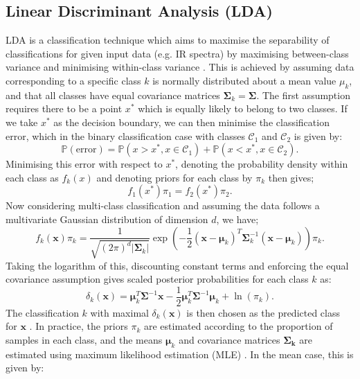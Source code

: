 \subsection{Linear Discriminant Analysis (LDA)}
\label{sec:methods:lda}
LDA \cite{fisher_use_1936} is a classification technique which aims to maximise the separability of classifications for given input data (e.g. IR spectra) by maximising between-class variance and minimising within-class variance \cite{tharwat_linear_2017}. This is achieved by assuming data corresponding to a specific class $k$ is normally distributed about a mean value $\mu_k$, and that all classes have equal covariance matrices $\boldsymbol{\Sigma}_k=\boldsymbol{\Sigma}$. The first assumption requires there to be a point $x^*$ which is equally likely to belong to two classes. If we take $x^*$ as the decision boundary, we can then minimise the classification error, which in the binary classification case with classes $\mathcal C_1$ and $\mathcal C_2$ is given by:
\begin{equation}
   \mathbb{P}(\text{error})= \mathbb{P}(x>x^*, x\in \mathcal C_1) + \mathbb{P}(x<x^*, x\in \mathcal C_2).
\end{equation}
Minimising this error with respect to $x^*$, denoting the probability density within each class as $f_k(x)$ and denoting priors for each class by $\pi_k$ then gives;
\begin{equation}
    f_1(x^*)\pi_1 = f_2(x^*)\pi_2.
\end{equation}
Now considering multi-class classification and assuming the data follows a multivariate Gaussian distribution of dimension $d$, we have;
\begin{equation}
    f_k(\boldsymbol{x})\pi_k=\frac{1}{\sqrt{(2\pi)^{d}|\mathbf{\Sigma}_k|}}\exp\left(-\frac{1}{2}(\boldsymbol{x}-\boldsymbol{\mu}_k)^T\boldsymbol{\Sigma}_k^{-1}(\boldsymbol{x}-\boldsymbol{\mu}_k)\right)\pi_k.
\end{equation}
Taking the logarithm of this, discounting constant terms and enforcing the equal covariance assumption gives scaled posterior probabilities for each class $k$ as:
\begin{equation}
    \delta_k(\boldsymbol{x}) = \boldsymbol{\mu}_k^T\boldsymbol{\Sigma}^{-1}\boldsymbol{x} - \frac{1}{2}\boldsymbol{\mu}_k^T\boldsymbol{\Sigma}^{-1}\boldsymbol{\mu}_k + \ln(\pi_k).
\end{equation}
The classification $k$ with maximal $\delta_k(\boldsymbol{x})$ is then chosen as the predicted class for $\boldsymbol{x}$ \cite{ghojogh_linear_2019}. In practice, the priors $\pi_k$ are estimated according to the proportion of samples in each class, and the means $\boldsymbol \mu_k$ and covariance matrices $\boldsymbol{\Sigma_k}$ are estimated using maximum likelihood estimation (MLE) \cite{haynes_maximum_2013}. In the mean case, this is given by:
